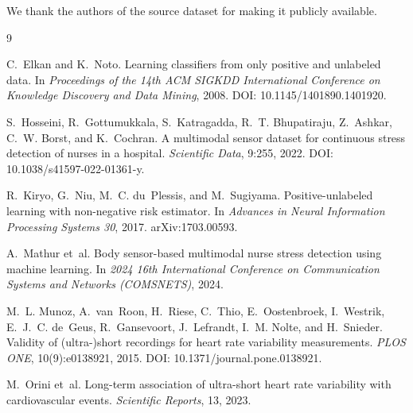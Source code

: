 \documentclass{article}
\begin{document}
\begin{ack}
We thank the authors of the source dataset for making it publicly available.
\end{ack}

\begin{thebibliography}{9}

C.~Elkan and K.~Noto.
\newblock Learning classifiers from only positive and unlabeled data.
\newblock In \emph{Proceedings of the 14th ACM SIGKDD International Conference
  on Knowledge Discovery and Data Mining}, 2008.
\newblock DOI: 10.1145/1401890.1401920.

S.~Hosseini, R.~Gottumukkala, S.~Katragadda, R.~T. Bhupatiraju, Z.~Ashkar,
  C.~W. Borst, and K.~Cochran.
\newblock A multimodal sensor dataset for continuous stress detection of nurses
  in a hospital.
\newblock \emph{Scientific Data}, 9:255, 2022.
\newblock DOI: 10.1038/s41597-022-01361-y.

R.~Kiryo, G.~Niu, M.~C. du~Plessis, and M.~Sugiyama.
\newblock Positive-unlabeled learning with non-negative risk estimator.
\newblock In \emph{Advances in Neural Information Processing Systems 30}, 2017.
\newblock arXiv:1703.00593.

A.~Mathur et~al.
\newblock Body sensor-based multimodal nurse stress detection using machine
  learning.
\newblock In \emph{2024 16th International Conference on Communication Systems
  and Networks (COMSNETS)}, 2024.

M.~L. Munoz, A.~van~Roon, H.~Riese, C.~Thio, E.~Oostenbroek, I.~Westrik,
  E.~J.~C. de~Geus, R.~Gansevoort, J.~Lefrandt, I.~M. Nolte, and H.~Snieder.
\newblock Validity of (ultra-)short recordings for heart rate variability
  measurements.
\newblock \emph{PLOS ONE}, 10(9):e0138921, 2015.
\newblock DOI: 10.1371/journal.pone.0138921.

M.~Orini et~al.
\newblock Long-term association of ultra-short heart rate variability with
  cardiovascular events.
\newblock \emph{Scientific Reports}, 13, 2023.

\end{thebibliography}
\end{document}
